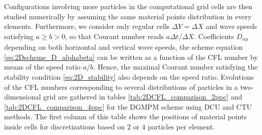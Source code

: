Configurations involving more particles in the computational grid cells are then studied numerically by assuming the same material points distribution in every elements. Furthermore, we consider only regular cells $\Delta Y = \Delta X$ and wave speeds satisfying $a\geq b >0$, so that Courant number reads $a\Delta t/\Delta X$. Coefficients $D_{\alpha \mu}$ depending on both horizontal and vertical wave speeds, the scheme equation \eqref{eq:2Dscheme_D_alphabeta} can be written as a function of the CFL number by means of the speed ratio  $a/b$. Hence, the maximal Courant number satisfying the stability condition \eqref{eq:2D_stability} also depends on the speed ratio.
Evolutions of the CFL numbers corresponding to several distributions of particles in a two-dimensional grid are gathered in tables \ref{tab:2DCFL_comparison_2ppc} and \ref{tab:2DCFL_comparison_4ppc} for the DGMPM scheme using DCU and CTU methods. The first column of this table shows the positions of material points inside cells for discretizations based on $2$ or $4$ particles per element. 

